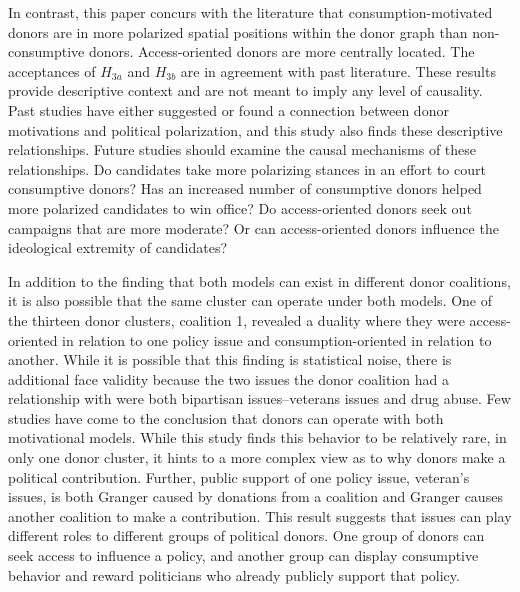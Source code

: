 \documentclass[12pt,]{article}
\begin{document}
In contrast, this paper concurs with the literature that
consumption-motivated donors are in more polarized spatial positions
within the donor graph than non-consumptive donors. Access-oriented
donors are more centrally located. The acceptances of \(H_{3a}\) and
\(H_{3b}\) are in agreement with past literature. These results provide
descriptive context and are not meant to imply any level of causality.
Past studies have either suggested or found a connection between donor
motivations and political polarization, and this study also finds these
descriptive relationships. Future studies should examine the causal
mechanisms of these relationships. Do candidates take more polarizing
stances in an effort to court consumptive donors? Has an increased
number of consumptive donors helped more polarized candidates to win
office? Do access-oriented donors seek out campaigns that are more
moderate? Or can access-oriented donors influence the ideological
extremity of candidates?

In addition to the finding that both models can exist in different donor
coalitions, it is also possible that the same cluster can operate under
both models. One of the thirteen donor clusters, coalition 1, revealed a
duality where they were access-oriented in relation to one policy issue
and consumption-oriented in relation to another. While it is possible
that this finding is statistical noise, there is additional face
validity because the two issues the donor coalition had a relationship
with were both bipartisan issues--veterans issues and drug abuse. Few
studies have come to the conclusion that donors can operate with both
motivational models. While this study finds this behavior to be
relatively rare, in only one donor cluster, it hints to a more complex
view as to why donors make a political contribution. Further, public
support of one policy issue, veteran's issues, is both Granger caused by
donations from a coalition and Granger causes another coalition to make
a contribution. This result suggests that issues can play different
roles to different groups of political donors. One group of donors can
seek access to influence a policy, and another group can display
consumptive behavior and reward politicians who already publicly support
that policy.
\end{document}
